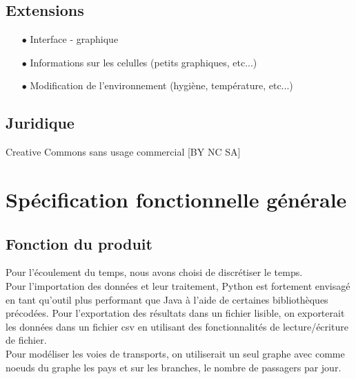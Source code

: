 \documentclass[12pt,a4paper]{report}
\begin{document}
\subsection*{Extensions}
\begin{flushleft}
  \begin{itemize}
	\item[$\bullet$] Interface - graphique 
	\item[$\bullet$] Informations sur les celulles (petits graphiques, etc...) 
	\item[$\bullet$] Modification de l'environnement (hygiène, température, etc...) 
  \end{itemize}
\end{flushleft}

\subsection*{Juridique}
\begin{flushleft}
Creative Commons sans usage commercial [BY NC SA]
\end{flushleft}

\section*{Spécification fonctionnelle générale}

\subsection*{Fonction du produit}
	\begin{flushleft}
	Pour l'écoulement du temps, nous avons choisi de discrétiser le temps. \\
	Pour l'importation des données et leur traitement, Python est fortement envisagé en tant qu'outil plus performant que Java à l'aide de certaines bibliothèques précodées.
	Pour l'exportation des résultats dans un fichier lisible, on exporterait les données dans un fichier csv en utilisant des fonctionnalités de lecture/écriture de fichier.\\
	Pour modéliser les voies de transports, on utiliserait un seul graphe avec comme noeuds du graphe les pays et sur les branches, le nombre de passagers par jour.
	\end{flushleft}
\end{document}
